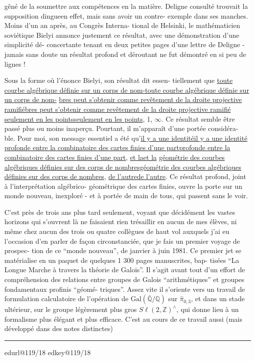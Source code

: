 \documentclass[11pt,a4paper]{article}
\makeatletter
\newif\ifreading
\newif\ifenglish
\def\CurrentScanURL{}
\def\CurrentPageKey{}
\def\CurrentApparatus{}
\newcommand{\scanpage}[1]{%
  \clearpage
  \expandafter\let\expandafter\CurrentScanURL\csname edurl@#1\endcsname
  \expandafter\let\expandafter\CurrentPageKey\csname edkey@#1\endcsname
  \def\CurrentApparatus{}%
  \hypertarget{scan-\CurrentPageKey}{}%
  \typeout{EDITION-SCAN: \CurrentPageKey; PDFPAGE: \the\numexpr\ReadonlyShipoutCounter+1\relax}%
  \ifreading
    \marginnote{\raggedright\scriptsize\sffamily\href{\CurrentScanURL}{119 / \csname edpage@#1\endcsname}}%
  \else
    \noindent{\small\sffamily\href{\CurrentScanURL}{[scan #1]}}\par\smallskip
  \fi}
\newcommand{\mspage}[1]{%
  \ifreading\marginnote{\raggedright\scriptsize\sffamily p.\,#1}[2\baselineskip]%
  \else\noindent{\small\sffamily[p.\,#1]}\par\smallskip\fi}
\let\TextUline\uline
\renewcommand{\uline}[1]{\ifmmode\underline{#1}\else\TextUline{#1}\fi}
\newcommand{\margin}[1]{%
  \sbox{\MarginalTestBox}{\parbox{\marginparwidth}{\raggedright\footnotesize#1}}%
  \ifdim\dimexpr\ht\MarginalTestBox+\dp\MarginalTestBox\relax>3\baselineskip
    \par\smallskip\noindent\begin{minipage}{\linewidth}\hrule\smallskip
    {\footnotesize\textcolor{HandInk}{\ifenglish Marginal note:\else Note marginale :\fi\ #1}}\smallskip\hrule\end{minipage}\par\smallskip
  \else
    \marginnote{\raggedright\footnotesize\textcolor{HandInk}{#1}}%
  \fi}
\newcommand{\finishscan}{\ifx\CurrentApparatus\empty\else\par\bigskip\noindent\rule{.35\linewidth}{.35pt}\par\smallskip{\footnotesize\setlength{\parskip}{3pt}\CurrentApparatus}\fi}
\makeatother
\begin{document}
gêné de la soumettre aux compétences en la matière. Deligne consulté
trouvait la supposition dingueen effet, mais sans avoir un contre-%
exemple dans ses manches. Moins d'un an après, au Congrès Interna-%
tional de Helsinki, le mathématicien soviétique Bielyi annonce
justement ce résultat, avec une démonstration d'une simplicité dé-%
concertante tenant en deux petites pages d'une lettre de Deligne -
jamais sans doute un résultat profond et déroutant ne fut démontré
en si peu de lignes !

Sous la forme où l'énonce Bielyi, son résultat dit essen-%
tiellement que \uline{toute courbe algébrique définie sur un corps de nom-}%
\uline{bres peut s'obtenir comme revêtement de la droite projective ramifié}
\uline{seulement en les points} 0, 1, $\infty$. Ce résultat semble être passé plus
ou moins inaperçu. Pourtant, il m'apparaît d'une portée considéra-%
ble. Pour moi, son message essentiel a été qu'\uline{il y a une identité}
\uline{profonde entre la combinatoire des cartes finies d'une part}, \uline{et la}
\uline{géométrie des courbes algébriques définies sur des corps de nombres},
\uline{de l'autre}. Ce résultat profond, joint à l'interprétation algébrico-%
géométrique des cartes finies, ouvre la porte sur un monde nouveau,
inexploré - et à portée de main de tous, qui passent sans le voir.

C'est près de trois ans plus tard seulement, voyant que
décidément les vastes horizons qui s'ouvrent là ne faisaient rien
trésaillir en aucun de mes élèves, ni même chez aucun des trois ou
quatre collègues de haut vol auxquels j'ai eu l'occasion d'en parler
de façon circonstanciée, que je fais un premier voyage de prospec-%
tion de ce ``monde nouveau'', de janvier à juin 1981. Ce premier jet se
matérialise en un paquet de quelques 1 300 pages manuscrites, bap-%
tisées ``La Longue Marche à travers la théorie de Galois''. Il s'agit
avant tout d'un effort de compréhension des relations entre groupes
de Galois ``arithmétiques'' et groupes fondamentaux profinis ``géomé-%
triques''. Assez vite il s'oriente vers un travail de formulation
calculatoire de l'opération de $\mathrm{Gal}(\bar{\mathbb{Q}}/\mathbb{Q})$ sur $\hat{\pi}_{0,3}$, et dans un
stade ultérieur, sur le groupe légèrement plus gros $S\ell(2,\mathbb{Z})^{\wedge}$, qui
donne lieu à un formalisme plus élégant et plus efficace. C'est au
cours de ce travail aussi (mais développé dans des notes distinctes)

\margin{17}

\finishscan
\scanpage{119/18}
\mspage{16}
\end{document}
